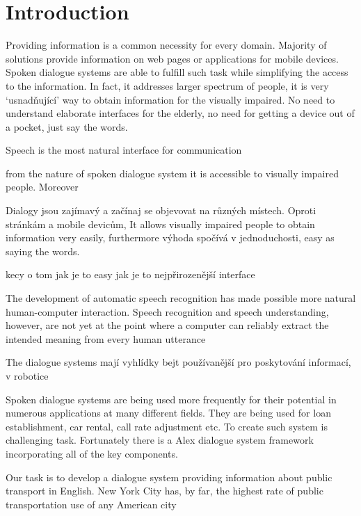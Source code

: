 \chapter*{Introduction}

Providing information is a common necessity for every domain.
Majority of solutions provide information on web pages or applications for mobile devices.
Spoken dialogue systems are able to fulfill such task while simplifying the access to the information.
In fact, it addresses larger spectrum of people, it is very `usnadňující' way to obtain information for the visually impaired.
No need to understand elaborate interfaces for the elderly, no need for getting a device out of a pocket, just say the words.

Speech is the most natural interface for communication

 from the nature of spoken dialogue system
 it is accessible to visually impaired people.
Moreover


Dialogy jsou zajímavý a začínaj se objevovat na různých místech. 
Oproti stránkám a mobile devicům, It allows visually impaired people to obtain information very easily, furthermore výhoda spočívá v jednoduchosti, easy as saying the words. 

kecy o tom jak je to easy jak je to nejpřirozenější interface



The development of automatic speech recognition
has made possible more natural human-computer
interaction. Speech recognition and speech understanding,
however, are not yet at the point
where a computer can reliably extract the intended
meaning from every human utterance

The dialogue systems mají vyhlídky bejt používanější pro poskytování informací, v robotice

Spoken dialogue systems are being used more frequently for their potential in numerous applications at many different fields.
They are being used for loan establishment, car rental, call rate adjustment etc.
To create such system is challenging task.
Fortunately there is a Alex dialogue system framework incorporating all of the key components.

Our task is to develop a dialogue system providing information about public transport in English.
 New York City has, by far, the highest rate of public transportation use of any American city


